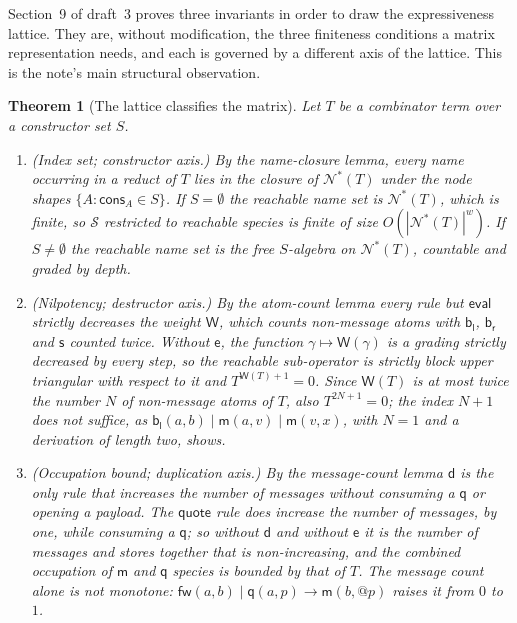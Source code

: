 \documentclass[11pt,a4paper]{article}
\makeatletter
\theoremstyle{plain}
\newtheorem{theorem}{Theorem}[section]
\theoremstyle{definition}
\theoremstyle{remark}
\newcommand{\quo}[1]{@#1}
\newcommand{\red}{\longrightarrow}
\newcommand{\nms}[1]{\mathcal{N}^{*}(#1)}
\newcommand{\mm}{\mathsf{m}}
\newcommand{\dd}{\mathsf{d}}
\newcommand{\fw}{\mathsf{fw}}
\newcommand{\bl}{\mathsf{b}_{\mathsf{l}}}
\newcommand{\br}{\mathsf{b}_{\mathsf{r}}}
\newcommand{\sy}{\mathsf{s}}
\newcommand{\ev}{\mathsf{e}}
\newcommand{\qq}{\mathsf{q}}
\newcommand{\Wt}{\mathsf{W}}
\newcommand{\cons}{\mathsf{cons}}
\newcommand{\Spec}{\mathcal{S}}
\makeatother
\begin{document}
Section~9 of draft~3 proves three invariants in order to draw the
expressiveness lattice. They are, without modification, the three finiteness
conditions a matrix representation needs, and each is governed by a different
axis of the lattice. This is the note's main structural observation.

\begin{theorem}[The lattice classifies the matrix]
\label{thm:three}
Let $T$ be a combinator term over a constructor set $S$.
\begin{enumerate}[label=(\roman*),leftmargin=2.4em]
\item \emph{(Index set; constructor axis.)} By the name-closure lemma, every
  name occurring in a reduct of $T$ lies in the closure of $\nms{T}$ under the
  node shapes $\{A : \cons_A \in S\}$. If $S = \emptyset$ the reachable name
  set is $\nms{T}$, which is finite, so $\Spec$ restricted to reachable
  species is finite of size $O(|\nms{T}|^{w})$. If $S \neq \emptyset$ the
  reachable name set is the free $S$-algebra on $\nms{T}$, countable and
  graded by depth.
\item \emph{(Nilpotency; destructor axis.)} By the atom-count lemma every rule
  but $\mathsf{eval}$ strictly decreases the weight $\Wt$, which counts
  non-message atoms with $\bl$, $\br$ and $\sy$ counted twice. Without $\ev$,
  the function $\gamma \mapsto \Wt(\gamma)$ is a grading strictly decreased by
  every step, so the reachable sub-operator is strictly block upper triangular
  with respect to it and $T^{\Wt(T)+1} = 0$. Since $\Wt(T)$ is at most twice
  the number $N$ of non-message atoms of $T$, also $T^{2N+1} = 0$; the index
  $N+1$ does not suffice, as $\bl(a,b) \mid \mm(a,v) \mid \mm(v,x)$, with
  $N = 1$ and a derivation of length two, shows.
\item \emph{(Occupation bound; duplication axis.)} By the message-count lemma
  $\dd$ is the only rule that increases the number of messages without
  consuming a $\qq$ or opening a payload. The $\mathsf{quote}$ rule does
  increase the number of messages, by one, while consuming a $\qq$; so without
  $\dd$ and without $\ev$ it is the number of messages \emph{and stores}
  together that is non-increasing, and the combined occupation of $\mm$ and
  $\qq$ species is bounded by that of $T$. The message count alone is not
  monotone: $\fw(a,b) \mid \qq(a,p) \red \mm(b,\quo{p})$ raises it from $0$
  to $1$.
\end{enumerate}
\end{theorem}
\end{document}
